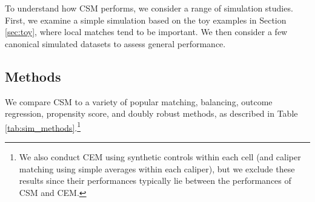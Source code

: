 \documentclass{article}
\begin{document}
To understand how CSM performs, we consider a range of simulation studies.
First, we examine a simple simulation based on the toy examples in Section \ref{sec:toy}, where local matches tend to be important.
We then consider a few canonical simulated datasets to assess general performance.

\subsection{Methods}

We compare CSM to a variety of popular matching, balancing, outcome regression, propensity score, and doubly robust methods, as described in Table \ref{tab:sim_methods}.\footnote{We also conduct CEM using synthetic controls within each cell (and caliper matching using simple averages within each caliper), but we exclude these results since their performances typically lie between the performances of CSM and CEM.}
\end{document}
